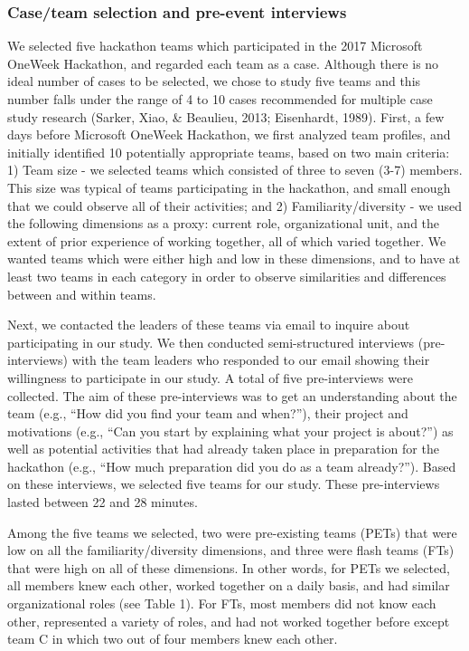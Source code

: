 \documentclass{hcij}
\begin{document}
\subsubsection{Case/team selection and pre-event interviews}
We selected five hackathon teams which participated in the 2017 Microsoft OneWeek Hackathon, and regarded each team as a case. Although there is no ideal number of cases to be selected, we chose to study five teams and this number falls under the range of 4 to 10 cases recommended for multiple case study research (Sarker, Xiao, & Beaulieu, 2013; Eisenhardt, 1989). First, a few days before Microsoft OneWeek Hackathon, we first analyzed team profiles, and initially identified 10 potentially appropriate teams, based on two main criteria: 1) Team size - we selected teams which consisted of three to seven (3-7) members. This size was typical of teams participating in the hackathon, and small enough that we could observe all of their activities; and 2) Familiarity/diversity - we used the following dimensions as a proxy: current role, organizational unit, and the extent of prior experience of working together, all of which varied together. We wanted teams which were either high and low in these dimensions, and to have at least two teams in each category in order to observe similarities and differences between and within teams.

Next, we contacted the leaders of these teams via email to inquire about participating in our study. We then conducted semi-structured interviews (pre-interviews) with the team leaders who responded to our email showing their willingness to participate in our study. A total of five pre-interviews were collected. The aim of these pre-interviews was to get an understanding about the team (e.g., “How did you find your team and when?”), their project and motivations (e.g., “Can you start by explaining what your project is about?”) as well as potential activities that had already taken place in preparation for the hackathon (e.g., “How much preparation did you do as a team already?”). Based on these interviews, we selected five teams for our study. These pre-interviews lasted between 22 and 28 minutes.

Among the five teams we selected, two were pre-existing teams (PETs) that were low on all the familiarity/diversity dimensions, and three were flash teams (FTs) that were high on all of these dimensions. In other words, for PETs we selected, all members knew each other, worked together on a daily basis, and had similar organizational roles (see Table 1). For FTs, most members did not know each other, represented a variety of roles, and had not worked together before except team C in which two out of four members knew each other.
\end{document}
